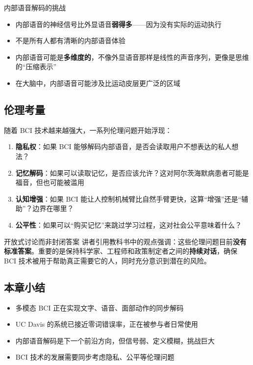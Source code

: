 \documentclass[a4paper]{article}
\begin{document}
\begin{warningbox}{内部语音解码的挑战}
\begin{itemize}
    \item 内部语音的神经信号比外显语音\textbf{弱得多}——因为没有实际的运动执行
    \item 不是所有人都有清晰的内部语音体验
    \item 内部语音可能是\textbf{多维度的}，不像外显语音那样是线性的声音序列，更像是思维的``压缩表示''
    \item 在大脑中，内部语音可能涉及比运动皮层更广泛的区域
\end{itemize}
\end{warningbox}

\subsection{伦理考量}

随着 BCI 技术越来越强大，一系列伦理问题开始浮现：

\begin{enumerate}
    \item \textbf{隐私权}：如果 BCI 能够解码内部语音，是否会读取用户不想表达的私人想法？
    \item \textbf{记忆解码}：如果可以读取记忆，是否应该允许？这对阿尔茨海默病患者可能是福音，但也可能被滥用
    \item \textbf{认知增强}：如果 BCI 能让人控制机械臂比自然手臂更快，这算``增强''还是``辅助''？边界在哪里？
    \item \textbf{公平性}：如果可以``购买记忆''来跳过学习过程，这对社会公平意味着什么？
\end{enumerate}

\begin{knowledgebox}{开放式讨论而非封闭答案}
讲者引用教科书中的观点强调：这些伦理问题目前\textbf{没有标准答案}。重要的是保持科学家、工程师和政策制定者之间的\textbf{持续对话}，确保 BCI 技术被用于帮助真正需要它的人，同时充分意识到潜在的风险。
\end{knowledgebox}

\subsection{本章小结}

\begin{itemize}
    \item 多模态 BCI 正在实现文字、语音、面部动作的同步解码
    \item UC Davis 的系统已接近零词错误率，正在被参与者日常使用
    \item 内部语音解码是下一个前沿方向，但信号弱、定义模糊，挑战巨大
    \item BCI 技术的发展需要同步考虑隐私、公平等伦理问题
\end{itemize}
\end{document}
